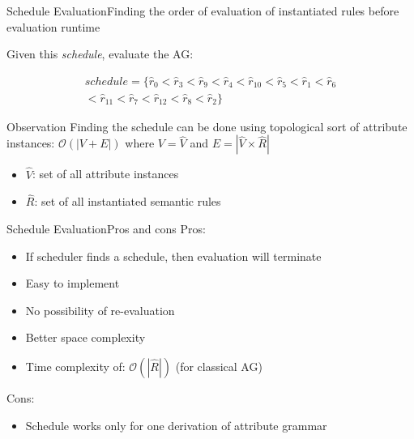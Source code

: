 \begin{frame}{Schedule Evaluation}{Finding the order of evaluation of instantiated rules before evaluation runtime}

Given this \emph{schedule}, evaluate the AG:

\begin{equation}
\begin{split}
\mathit{schedule} = \Big \{\hat{r}_0 < \hat{r}_3 < \hat{r}_9 < \hat{r}_4 < \hat{r}_{10} < \hat{r}_5 < \hat{r}_1 < \hat{r}_6 \\
< \hat{r}_{11} < \hat{r}_7 < \hat{r}_{12} < \hat{r}_8 < \hat{r}_2 \Big \}    
\end{split}
\end{equation}

\begin{alertblock}{Observation}
Finding the schedule can be done using topological sort of attribute instances: $\mathcal{O}(| V +  E|)$ where $V = \hat{V}$ and $E = |\hat{V}  \times  \hat{R}|$
\end{alertblock}

\begin{itemize}
    \item $\hat{V}$: set of all attribute instances
    \item $\hat{R}$: set of all instantiated semantic rules
\end{itemize}
\end{frame}




\begin{frame}{Schedule Evaluation}{Pros and cons}
Pros:
\begin{itemize}
    \item If scheduler finds a schedule, then evaluation \alert{will terminate}
    \item Easy to implement
    \item \alert{No possibility of re-evaluation}
    \item Better space complexity
    \item Time complexity of: $\mathcal{O}(| \hat{R} |)$ (for classical AG)
\end{itemize}

Cons:
\begin{itemize}
    \item Schedule \alert{works only for one derivation} of attribute grammar
\end{itemize}
\end{frame}

